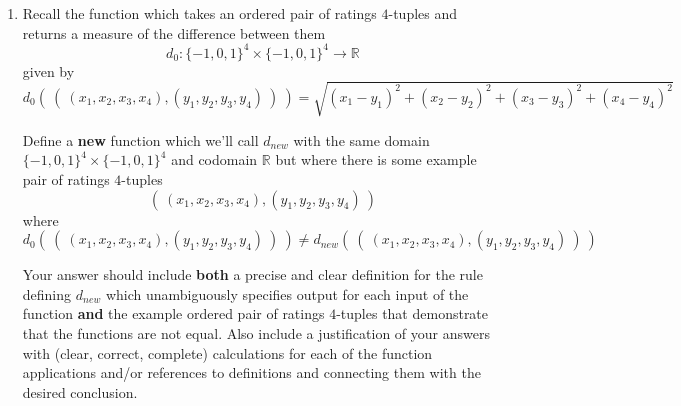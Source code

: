 \documentclass[12pt, oneside]{article}
\begin{document}
\begin{enumerate}[labelindent=0pt, leftmargin=0pt]
\begin{enumerate}
\begin{enumerate}
\item $$\{ n \in \mathbb{Z}^+ \mid n \leq 3 \} \times \{ m \in \mathbb{N} \mid m \leq 3\}$$
\item The set $X$ defined recursively as 
    \[
    \begin{array}{ll}
    \textrm{Basis Step: } & 1 \in X, 3 \in X, 5 \in X \\
    \textrm{Recursive Step: } & \textrm{If the integer } n \in X \textrm{, then the result of multiplying } n \textrm{ by } -1 \textrm{ is in }X
    \end{array}
    \]
\item $$\{ x \in S \mid rnalen(x) = 2 \} \circ \{x \in S \mid rnalen(x) = 0 \}$$
where $S$ is the set of RNA strands and $rnalen$ is the recursively defined
function that we discussed in class,
\[
\begin{array}{llll}
& & \textit{rnalen} : S & \to \mathbb{Z}^+ \\
\textrm{Basis Step:} & \textrm{If } b \in B\textrm{ then } & \textit{rnalen}(b) & = 1 \\
\textrm{Recursive Step:} & \textrm{If } s \in S\textrm{ and }b \in B\textrm{, then  } & \textit{rnalen}(sb) & = 1 + \textit{rnalen}(s)
\end{array}
\]
\item $$\{ (r,g,b) \in C \mid r+g+b = 2 \textrm{ and } g=1\}$$ where 
$C = \{ (r,g,b) \mid 0 \leq r \leq 255, 0 \leq g \leq 255, 0 \leq b \leq 255, r \in \mathbb{N}, g \in \mathbb{N}, b \in \mathbb{N} \}$.
\end{enumerate}

\item Recall the function which takes an ordered pair of ratings $4$-tuples and returns a measure of the difference between them
\[
    d_0: \{-1,0,1\}^4 \times \{-1,0,1\}^4 \to \mathbb{R}
\]
given by
\[
d_0 (~(~ (x_1, x_2, x_3, x_4), (y_1, y_2, y_3, y_4) ~) ~) = \sqrt{ (x_1 - y_1)^2 + (x_2 - y_2)^2 + (x_3 -y_3)^2 + (x_4 -y_4)^2}
\]

Define a {\bf new} function which we'll call $d_{new}$ with the same domain $\{-1,0,1\}^4 \times \{-1,0,1\}^4$
and codomain $\mathbb{R}$ but where there is some example pair of ratings $4$-tuples 
\[(~ (x_1, x_2, x_3, x_4), (y_1, y_2, y_3, y_4)~)\]
where
\[
d_0 (~(~ (x_1, x_2, x_3, x_4), (y_1, y_2, y_3, y_4) ~) ~) \neq d_{new} (~(~ (x_1, x_2, x_3, x_4), (y_1, y_2, y_3, y_4) ~) ~)
\]

    Your answer should include  {\bf both} a precise and clear definition for the rule defining
    $d_{new}$ which unambiguously specifies output for each input of the function {\bf and}
    the example ordered pair of ratings $4$-tuples that demonstrate that the functions are not equal.
    Also include a justification 
    of your answers with (clear, correct, complete) calculations for each of the function applications 
    and/or references to definitions and connecting them with
    the desired conclusion.


\end{enumerate}
\end{enumerate}
\end{document}

